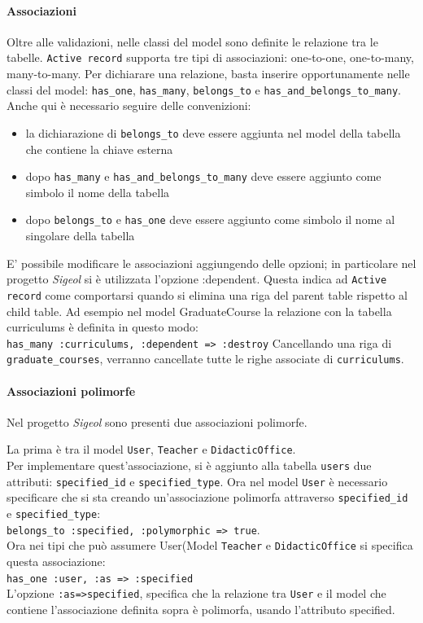 \documentclass[11pt,a4paper]{article}
\begin{document}
\paragraph{Associazioni}
Oltre alle validazioni, nelle classi del model sono definite le relazione tra le tabelle.
\verb|Active record| supporta tre tipi di associazioni: one-to-one, one-to-many, many-to-many.
Per dichiarare una relazione, basta inserire opportunamente nelle classi del model: \verb|has_one|, \verb|has_many|, \verb|belongs_to| e \verb|has_and_belongs_to_many|.
Anche qui è necessario seguire delle convenizioni:
\begin{itemize}
 \item la dichiarazione di \verb|belongs_to| deve essere aggiunta nel model della tabella che contiene la chiave esterna
 \item dopo \verb|has_many| e \verb|has_and_belongs_to_many| deve essere aggiunto come simbolo il nome della tabella
 \item dopo \verb|belongs_to| e \verb|has_one| deve essere aggiunto come simbolo il nome al singolare della tabella
\end{itemize}



E' possibile modificare le associazioni aggiungendo delle opzioni; in particolare nel progetto \textit{Sigeol} si è utilizzata l'opzione :dependent.
Questa indica ad \verb|Active record| come comportarsi quando si elimina una riga del parent table rispetto al child table.
Ad esempio nel model GraduateCourse la relazione con la tabella curriculums è definita in questo modo:\\
\verb|has_many :curriculums, :dependent => :destroy|
Cancellando una riga di \verb|graduate_courses|, verranno cancellate tutte le righe associate di \verb|curriculums|.

\paragraph{Associazioni polimorfe}
Nel progetto \textit{Sigeol} sono presenti due associazioni polimorfe.


La prima è tra il model \verb|User|, \verb|Teacher| e \verb|DidacticOffice|.\\ 
Per implementare quest'associazione, si è aggiunto alla tabella \verb|users| due attributi: \verb|specified_id| e \verb|specified_type|.
Ora nel model \verb|User| è necessario specificare che si sta creando un'associazione polimorfa attraverso \verb|specified_id| e \verb|specified_type|:\\
\verb|belongs_to :specified, :polymorphic => true|.\\
Ora nei tipi che può assumere User(Model \verb|Teacher| e \verb|DidacticOffice| si specifica questa associazione:\\
\verb|has_one :user, :as => :specified|\\
L'opzione \verb|:as=>specified|, specifica che la relazione tra \verb|User| e il model che contiene l'associazione definita sopra è polimorfa, usando l'attributo specified.
\end{document}
